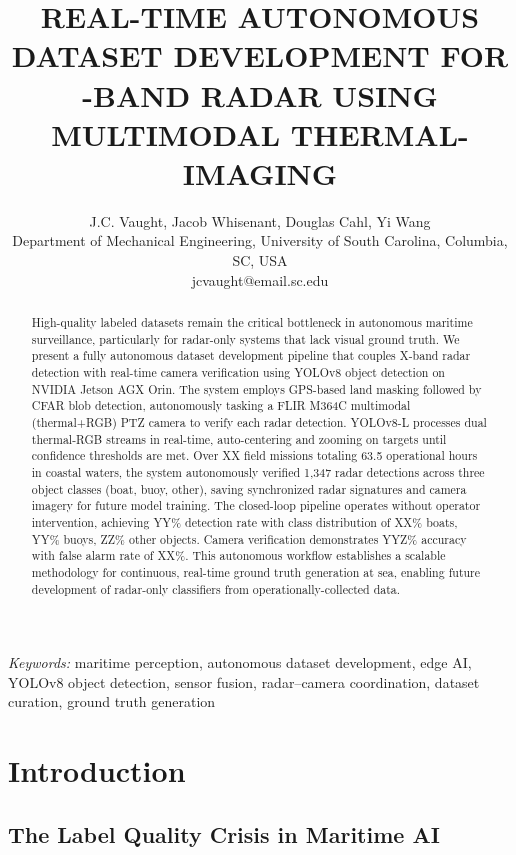 \documentclass[twocolumn, 10pt]{article}
\title{REAL-TIME AUTONOMOUS DATASET DEVELOPMENT FOR \NoCaseChange{X}-BAND RADAR USING MULTIMODAL THERMAL-\NoCaseChange{RGB} IMAGING}
\author{J.C. Vaught, Jacob Whisenant, Douglas Cahl, Yi Wang\\
\small Department of Mechanical Engineering, University of South Carolina, Columbia, SC, USA\\
\small jcvaught@email.sc.edu}
\begin{document}
\maketitle

\noindent\textit{Keywords:} maritime perception, autonomous dataset development, edge AI, YOLOv8 object detection, sensor fusion, radar--camera coordination, dataset curation, ground truth generation

\begin{abstract}
High-quality labeled datasets remain the critical bottleneck in autonomous maritime surveillance, particularly for radar-only systems that lack visual ground truth. We present a fully autonomous dataset development pipeline that couples X-band radar detection with real-time camera verification using YOLOv8 object detection on NVIDIA Jetson AGX Orin. The system employs GPS-based land masking followed by CFAR blob detection, autonomously tasking a FLIR M364C multimodal (thermal+RGB) PTZ camera to verify each radar detection. YOLOv8-L processes dual thermal-RGB streams in real-time, auto-centering and zooming on targets until confidence thresholds are met. Over XX field missions totaling 63.5 operational hours in coastal waters, the system autonomously verified 1,347 radar detections across three object classes (boat, buoy, other), saving synchronized radar signatures and camera imagery for future model training. The closed-loop pipeline operates without operator intervention, achieving YY\% detection rate with class distribution of XX\% boats, YY\% buoys, ZZ\% other objects. Camera verification demonstrates YYZ\% accuracy with false alarm rate of XX\%. This autonomous workflow establishes a scalable methodology for continuous, real-time ground truth generation at sea, enabling future development of radar-only classifiers from operationally-collected data.
\end{abstract}

\begin{nomenclature}
\end{nomenclature}

\section{Introduction}

\subsection{The Label Quality Crisis in Maritime AI}
\end{document}
